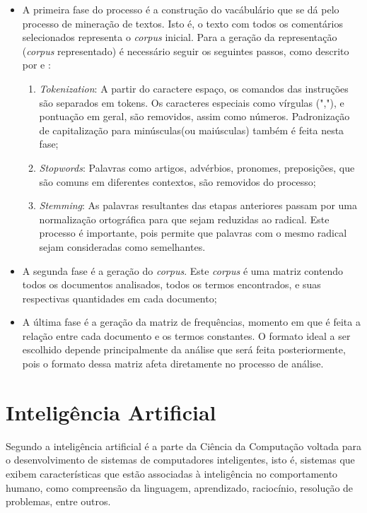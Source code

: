 \documentclass[
	12pt,				%
	openright,			%
	twoside,			%
	a4paper,			%
	english,			%
	french,				%
	spanish,			%
	brazil				%
	]{abntex2}
\begin{document}
\begin{itemize}
	\item A primeira fase do processo é a construção do vacábulário que se dá pelo processo de mineração de textos. Isto é, o texto com todos os comentários selecionados representa o \emph{corpus} inicial. Para a geração da representação (\emph{corpus} representado) é necessário seguir os seguintes passos, como descrito por  e :
	\begin{enumerate}
		\item \emph{Tokenization}: A partir do caractere espaço, os comandos das instruções são separados em tokens. Os caracteres especiais como vírgulas (","), e pontuação em geral, são removidos, assim como números. Padronização de capitalização para minúsculas(ou maiúsculas) também é feita nesta fase;
		\item \emph{Stopwords}: Palavras como artigos, advérbios, pronomes, preposições, que são comuns em diferentes contextos, são removidos do processo;
		\item \emph{Stemming}: As palavras resultantes das etapas anteriores passam por uma normalização ortográfica para que sejam reduzidas ao radical. Este processo é importante, pois permite que palavras com o mesmo radical sejam consideradas como semelhantes.
	\end{enumerate}
	\item A segunda fase é a geração do \emph{corpus}. Este \emph{corpus} é uma matriz contendo todos os documentos analisados, todos os termos encontrados, e suas respectivas quantidades em cada documento;
	\item A última fase é a geração da matriz de frequências, momento em que é feita a relação entre cada documento e os termos constantes. O formato ideal a ser escolhido depende principalmente da análise que será feita posteriormente, pois o formato dessa matriz afeta diretamente no processo de análise.
\end{itemize}

\section{Inteligência Artificial}
Segundo  a inteligência artificial é a parte da Ciência da Computação voltada para o desenvolvimento de sistemas de computadores inteligentes, isto é, sistemas que exibem características que estão associadas à inteligência no comportamento humano, como compreensão da linguagem, aprendizado, raciocínio, resolução de problemas, entre outros.
\end{document}
